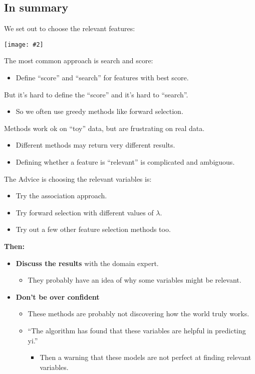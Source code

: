 \documentclass{article}
\def\blu#1{{\color{blu}#1}}
\def\gre#1{{\color{gre}#1}}
\def\red#1{{\color{red}#1}}
\theoremstyle{definition}
\newcommand{\centerfig}[2]{\begin{center}\texttt{[image: \#2]}\end{center}}
\begin{document}
\subsection*{In summary}
We set out to choose the relevant features:
\centerfig{0.4}{summ-1}
The most common approach is \blu{search and score}:
\begin{itemize}
	\item Define “score” and “search” for features with best score.
\end{itemize}
But it’s \red{hard to define the “score” and it’s hard to “search”}. 
\begin{itemize}
	\item So we often use greedy methods like \blu{forward selection}.
\end{itemize}
Methods work ok on “toy” data, but are \red{frustrating on real data}. 
\begin{itemize}
	\item Different methods may return very different results.
	\item Defining whether a feature is “relevant” is complicated and ambiguous.
\end{itemize}
The Advice is choosing the relevant variables is:
\begin{itemize}
	\item Try the association approach.
	\item Try forward selection with different values of $\lambda$.
	\item Try out a few other feature selection methods too.
\end{itemize}
\textbf{Then:}
\begin{itemize}
	\item \gre{\textbf{Discuss the results}} with the domain expert.
	\begin{itemize}
		\item They probably have an idea of why some variables might be relevant.
	\end{itemize}
\item \red{\textbf{Don’t be over confident}}
\begin{itemize}
	\item These methods are probably not discovering how the world truly works.
	\item “The algorithm has found that these variables are helpful in predicting yi.” 
	\begin{itemize}
		\item Then a warning that these models are not perfect at finding relevant variables.
	\end{itemize}
\end{itemize}
\end{itemize}
\newpage
\end{document}
